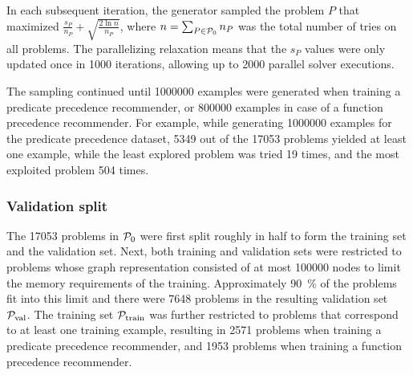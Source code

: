 In each subsequent iteration, the generator sampled the problem $P$ that maximized
$\frac{s_P}{n_P} + \sqrt{\frac{2 \ln n}{n_P}}$,
where $n = \sum_{P \in \operatorname{\mathcal{P}_{0}}} n_P$ was the total number of tries on all problems.
The parallelizing relaxation means that the $s_P$ values were only updated once in \num{1000} iterations,
allowing up to \num{2000} parallel solver executions.

The sampling continued until \num{1000000} examples were generated when training a predicate precedence recommender,
or \num{800000} examples in case of a function precedence recommender.
For example, while generating \num{1000000} examples for the predicate precedence dataset,
\num{5349} out of the \num{17053} problems yielded at least one example,
while the least explored problem was tried 19 times, and the most exploited problem 504 times.

\subsubsection{Validation split}

The \num{17053} problems in $\operatorname{\mathcal{P}_{0}}$ were first split roughly in half to form the training set and the validation set.
Next, both training and validation sets were restricted
to problems whose graph representation consisted of at most \num{100000} nodes
to limit the memory requirements of the training.
Approximately \SI{90}{\percent} of the problems fit into this limit
and there were \num{7648} problems in the resulting validation set $\operatorname{\mathcal{P}_{\mathrm{val}}}$.
The training set $\operatorname{\mathcal{P}_{\mathrm{train}}}$ was further restricted to problems that correspond to at least one training example,
resulting in \num{2571} problems when training a predicate precedence recommender,
and \num{1953} problems when training a function precedence recommender.

